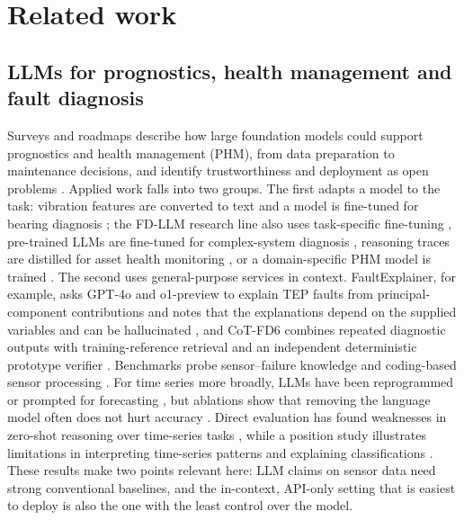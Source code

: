\documentclass[11pt,a4paper]{article}
\begin{document}
\section{Related work}\label{sec:related}
\subsection{LLMs for prognostics, health management and fault diagnosis}
Surveys and roadmaps describe how large foundation models could support prognostics and health management (PHM), from data preparation to maintenance decisions, and identify trustworthiness and deployment as open problems \citep{li2024chatgptphm,tao2025phmlm,chen2025largemodels}. Applied work falls into two groups. The first adapts a model to the task: vibration features are converted to text and a model is fine-tuned for bearing diagnosis \citep{tao2025llmbearing}; the FD-LLM research line also uses task-specific fine-tuning \citep{qaid2024fdllm,qaid2026explainable}, pre-trained LLMs are fine-tuned for complex-system diagnosis \citep{zheng2024empirical}, reasoning traces are distilled for asset health monitoring \citep{lin2025finetuned}, or a domain-specific PHM model is trained \citep{ren2026phmgpt}. The second uses general-purpose services in context. FaultExplainer, for example, asks GPT-4o and o1-preview to explain TEP faults from principal-component contributions and notes that the explanations depend on the supplied variables and can be hallucinated \citep{khan2025faultexplainer}, and CoT-FD6 combines repeated diagnostic outputs with training-reference retrieval and an independent deterministic prototype verifier \citep{kiangala2026verification}. Benchmarks probe sensor--failure knowledge \citep{constantinides2025failuresensoriq} and coding-based sensor processing \citep{sensorbench2025}. For time series more broadly, LLMs have been reprogrammed or prompted for forecasting \citep{jin2024time,gruver2023large,liu2024large}, but ablations show that removing the language model often does not hurt accuracy \citep{tan2024useful}. Direct evaluation has found weaknesses in zero-shot reasoning over time-series tasks \citep{merrill2024struggle}, while a position study illustrates limitations in interpreting time-series patterns and explaining classifications \citep{jin2024position}. These results make two points relevant here: LLM claims on sensor data need strong conventional baselines, and the in-context, API-only setting that is easiest to deploy is also the one with the least control over the model.
\end{document}
